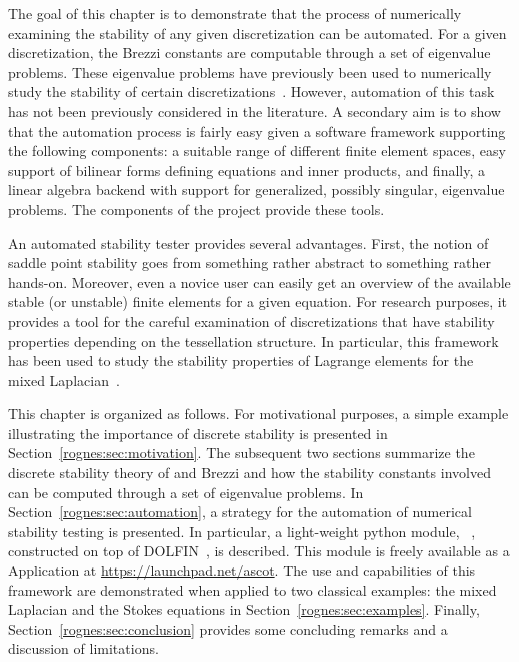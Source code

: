 The goal of this chapter is to demonstrate that the process of
numerically examining the stability of any given discretization can be
automated. For a given discretization, the Brezzi constants are
computable through a set of eigenvalue problems. These eigenvalue
problems have previously been used to numerically study the stability
of certain discretizations~\citep{ArnoldRognes2009, ChapelleBathe1993,
Qin1994}. However, automation of this task has not been previously
considered in the literature. A secondary aim is to show that the
automation process is fairly easy given a software framework
supporting the following components: a suitable range of different
finite element spaces, easy support of bilinear forms defining
equations and inner products, and finally, a linear algebra backend
with support for generalized, possibly singular, eigenvalue
problems. The components of the \fenics{} project provide these tools.

An automated stability tester provides several advantages. First, the
notion of saddle point stability goes from something rather abstract
to something rather hands-on. Moreover, even a novice user can easily
get an overview of the available stable (or unstable) finite elements
for a given equation. For research purposes, it provides a tool for
the careful examination of discretizations that have stability
properties depending on the tessellation structure. In particular,
this framework has been used to study the stability properties of
Lagrange elements for the mixed Laplacian~\citep{ArnoldRognes2009}.

This chapter is organized as follows. For motivational purposes, a
simple example illustrating the importance of discrete stability is
presented in Section~\ref{rognes:sec:motivation}. The subsequent two
sections summarize the discrete stability theory of \babuska{} and
Brezzi and how the stability constants involved can be computed
through a set of eigenvalue problems. In
Section~\ref{rognes:sec:automation}, a strategy for the automation of
numerical stability testing is presented. In particular, a
light-weight python module, \rognesascot{}~\citep{Rognes2009},
constructed on top of DOLFIN~\citep{LoggWells2010}, is described. This
module is freely available as a \fenics{} Application
at \url{https://launchpad.net/ascot}. The use and capabilities of this
framework are demonstrated when applied to two classical examples: the
mixed Laplacian and the Stokes equations in
Section~\ref{rognes:sec:examples}. Finally,
Section~\ref{rognes:sec:conclusion} provides some concluding remarks
and a discussion of limitations.

